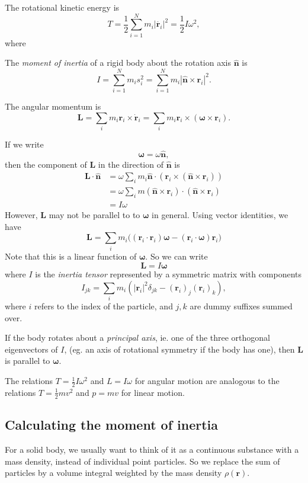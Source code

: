 \documentclass[a4paper]{article}
\begin{document}
The rotational kinetic energy is
\[
  T = \frac{1}{2}\sum_{i = 1}^N m_i|\dot{\mathbf{r}_i}|^2 = \frac{1}{2}I\omega^2,
\]
where
\begin{defi}
  The \emph{moment of inertia} of a rigid body about the rotation axis $\hat{\mathbf{n}}$ is
  \[
    I = \sum_{i = 1}^N m_is_i^2 = \sum_{i = 1}^N m_i |\hat{\mathbf{n}}\times \mathbf{r}_i|^2.
  \]
\end{defi}
\begin{defi}
  The angular momentum is
  \[
    \mathbf{L} = \sum_i m_i \mathbf{r}_i \times \dot{\mathbf{r}}_i = \sum_i m_i \mathbf{r}_i \times (\boldsymbol\omega \times \mathbf{r}_i).
  \]
\end{defi}
If we write 
\[
  \boldsymbol\omega = \omega\hat{\mathbf{n}},
\]
then the component of $\mathbf{L}$ in the direction of $\hat{\mathbf{n}}$ is
\begin{align*}
  \mathbf{L} \cdot \hat{\mathbf{n}} &= \omega \sum_i m_i \hat{\mathbf{n}}\cdot (\mathbf{r}_i \times (\hat{\mathbf{n}} \times \mathbf{r}_i))\\
  &= \omega \sum_i m(\hat{\mathbf{n}}\times \mathbf{r}_i)\cdot (\hat{\mathbf{n}} \times \mathbf{r}_i)\\
  &= I\omega
\end{align*}
However, $\mathbf{L}$ may not be parallel to to $\boldsymbol\omega$ in general. Using vector identities, we have
\[
  \mathbf{L} = \sum_i m_i\big((\mathbf{r}_i\cdot \mathbf{r}_i)\boldsymbol \omega - (\mathbf{r}_i \cdot \boldsymbol\omega)\mathbf{r}_i\big)
\]
Note that this is a linear function of $\boldsymbol\omega$. So we can write
\[
  \mathbf{L} = I\boldsymbol \omega
\]
where $I$ is the \emph{inertia tensor} represented by a symmetric matrix with components
\[
  I_{jk} = \sum_i m_i(|\mathbf{r}_i|^2 \delta_{jk} - (\mathbf{r}_i)_j(\mathbf{r}_i)_k),
\]
where $i$ refers to the index of the particle, and $j, k$ are dummy suffixes summed over.

If the body rotates about a \emph{principal axis}, ie. one of the three orthogonal eigenvectors of $I$, (eg. an axis of rotational symmetry if the body has one), then $\mathbf{L}$ is parallel to $\boldsymbol\omega$.

The relations $T = \frac{1}{2}I\omega^2$ and $L = I\omega$ for angular motion are analogous to the relations $T = \frac{1}{2}mv^2$ and $p = mv$ for linear motion.

\subsection{Calculating the moment of inertia}
For a solid body, we usually want to think of it as a continuous substance with a mass density, instead of individual point particles. So we replace the sum of particles by a volume integral weighted by the mass density $\rho(\mathbf{r})$.
\end{document}

